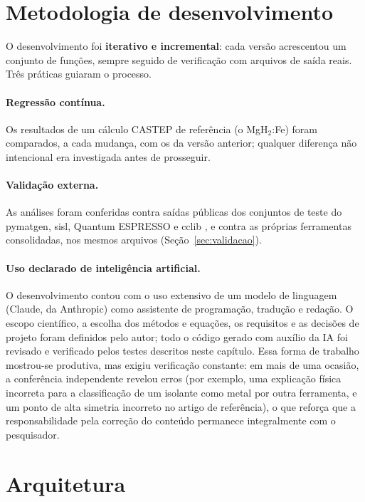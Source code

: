 \section{Metodologia de desenvolvimento}

O desenvolvimento foi \textbf{iterativo e incremental}: cada versão acrescentou um conjunto de funções, sempre seguido de verificação com arquivos de saída reais. Três práticas guiaram o processo.

\paragraph{Regressão contínua.} Os resultados de um cálculo CASTEP de referência (o MgH$_2$:Fe) foram comparados, a cada mudança, com os da versão anterior; qualquer diferença não intencional era investigada antes de prosseguir.

\paragraph{Validação externa.} As análises foram conferidas contra saídas públicas dos conjuntos de teste do pymatgen, sisl, Quantum ESPRESSO e cclib \cite{oboyle2008cclib}, e contra as próprias ferramentas consolidadas, nos mesmos arquivos (Seção~\ref{sec:validacao}).

\paragraph{Uso declarado de inteligência artificial.} O desenvolvimento contou com o uso extensivo de um modelo de linguagem (Claude, da Anthropic) como assistente de programação, tradução e redação. O escopo científico, a escolha dos métodos e equações, os requisitos e as decisões de projeto foram definidos pelo autor; todo o código gerado com auxílio da IA foi revisado e verificado pelos testes descritos neste capítulo. Essa forma de trabalho mostrou-se produtiva, mas exigiu verificação constante: em mais de uma ocasião, a conferência independente revelou erros (por exemplo, uma explicação física incorreta para a classificação de um isolante como metal por outra ferramenta, e um ponto de alta simetria incorreto no artigo de referência), o que reforça que a responsabilidade pela correção do conteúdo permanece integralmente com o pesquisador.

\section{Arquitetura}

